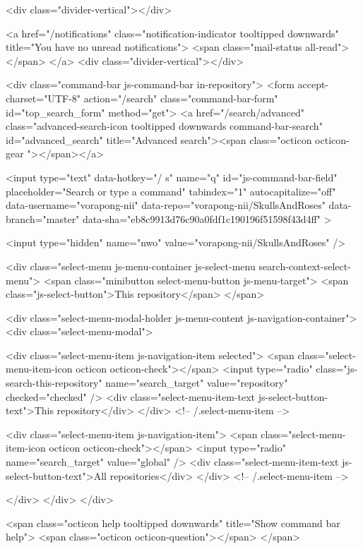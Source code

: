     <div class="divider-vertical"></div>

      <a href="/notifications" class="notification-indicator tooltipped downwards" title="You have no unread notifications">
    <span class="mail-status all-read"></span>
  </a>
  <div class="divider-vertical"></div>


      <div class="command-bar js-command-bar  in-repository">
          <form accept-charset="UTF-8" action="/search" class="command-bar-form" id="top_search_form" method="get">
  <a href="/search/advanced" class="advanced-search-icon tooltipped downwards command-bar-search" id="advanced_search" title="Advanced search"><span class="octicon octicon-gear "></span></a>

  <input type="text" data-hotkey="/ s" name="q" id="js-command-bar-field" placeholder="Search or type a command" tabindex="1" autocapitalize="off"
    data-username="vorapong-nii"
      data-repo="vorapong-nii/SkullsAndRoses"
      data-branch="master"
      data-sha="eb8c9913d76c90a0fdf1c190196f51598f43d4ff"
  >

    <input type="hidden" name="nwo" value="vorapong-nii/SkullsAndRoses" />

    <div class="select-menu js-menu-container js-select-menu search-context-select-menu">
      <span class="minibutton select-menu-button js-menu-target">
        <span class="js-select-button">This repository</span>
      </span>

      <div class="select-menu-modal-holder js-menu-content js-navigation-container">
        <div class="select-menu-modal">

          <div class="select-menu-item js-navigation-item selected">
            <span class="select-menu-item-icon octicon octicon-check"></span>
            <input type="radio" class="js-search-this-repository" name="search_target" value="repository" checked="checked" />
            <div class="select-menu-item-text js-select-button-text">This repository</div>
          </div> <!-- /.select-menu-item -->

          <div class="select-menu-item js-navigation-item">
            <span class="select-menu-item-icon octicon octicon-check"></span>
            <input type="radio" name="search_target" value="global" />
            <div class="select-menu-item-text js-select-button-text">All repositories</div>
          </div> <!-- /.select-menu-item -->

        </div>
      </div>
    </div>

  <span class="octicon help tooltipped downwards" title="Show command bar help">
    <span class="octicon octicon-question"></span>
  </span>


